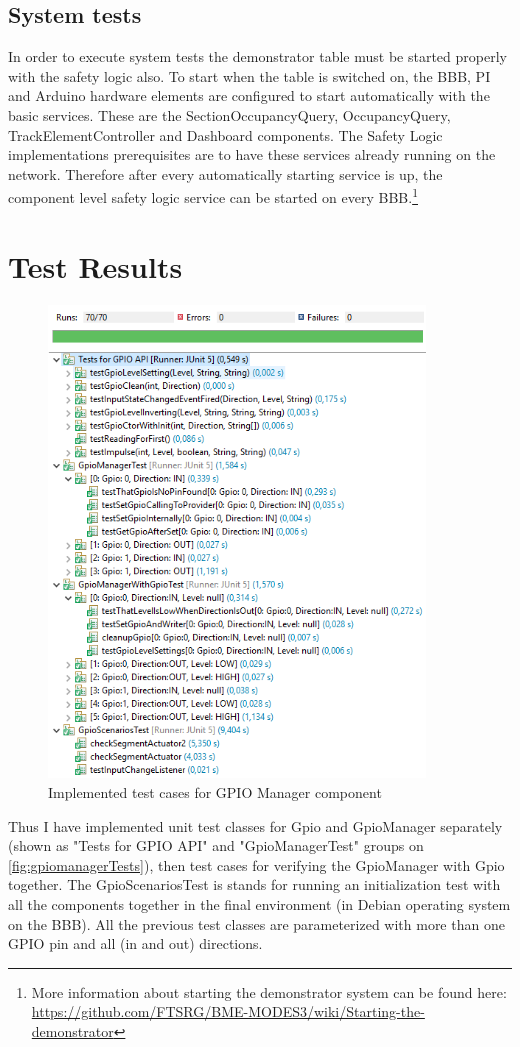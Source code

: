 \subsection{System tests}
In order to execute system tests the demonstrator table must be started properly with the safety logic also. To start when the table is switched on, the BBB, PI and Arduino hardware elements are configured to start automatically with the basic services. These are the SectionOccupancyQuery, OccupancyQuery, TrackElementController and Dashboard components. The Safety Logic implementations prerequisites are to have these services already running on the network. Therefore after every automatically starting service is up, the component level safety logic service can be started on every BBB.\footnote{More information about starting the demonstrator system can be found here: \url{https://github.com/FTSRG/BME-MODES3/wiki/Starting-the-demonstrator}}

\section{Test Results}
\begin{figure}[ht]
	\centering
	\includegraphics[width=100mm, keepaspectratio]{figures/impl/gpioTests.png}
	\caption{Implemented test cases for GPIO Manager component}
	\label{fig:gpiomanagerTests}
\end{figure}
Thus I have implemented unit test classes for Gpio and GpioManager separately (shown as "Tests for GPIO API" and "GpioManagerTest" groups on \autoref{fig:gpiomanagerTests}), then test cases for verifying the GpioManager with Gpio together. The GpioScenariosTest is stands for running an initialization test with all the components together in the final environment (in Debian operating system on the BBB). All the previous test classes are parameterized with more than one GPIO pin and all (in and out) directions.

